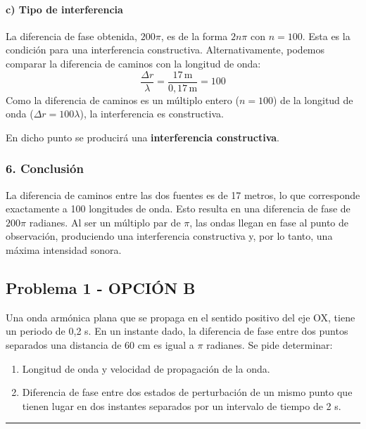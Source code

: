 \paragraph{c) Tipo de interferencia}
La diferencia de fase obtenida, $200\pi$, es de la forma $2n\pi$ con $n=100$. Esta es la condición para una interferencia constructiva.
Alternativamente, podemos comparar la diferencia de caminos con la longitud de onda:
$$ \frac{\Delta r}{\lambda} = \frac{17 \, \text{m}}{0,17 \, \text{m}} = 100 $$
Como la diferencia de caminos es un múltiplo entero ($n=100$) de la longitud de onda ($\Delta r = 100\lambda$), la interferencia es constructiva.

\begin{cajaresultado}
    En dicho punto se producirá una \textbf{interferencia constructiva}.
\end{cajaresultado}

\subsubsection*{6. Conclusión}
\begin{cajaconclusion}
La diferencia de caminos entre las dos fuentes es de 17 metros, lo que corresponde exactamente a 100 longitudes de onda. Esto resulta en una diferencia de fase de $200\pi$ radianes. Al ser un múltiplo par de $\pi$, las ondas llegan en fase al punto de observación, produciendo una interferencia constructiva y, por lo tanto, una máxima intensidad sonora.
\end{cajaconclusion}

\newpage

\subsection{Problema 1 - OPCIÓN B}
\label{subsec:2B_2000_jun_ord}

\begin{cajaenunciado}
Una onda armónica plana que se propaga en el sentido positivo del eje OX, tiene un periodo de 0,2 s. En un instante dado, la diferencia de fase entre dos puntos separados una distancia de 60 cm es igual a $\pi$ radianes. Se pide determinar:
\begin{enumerate}
    \item Longitud de onda y velocidad de propagación de la onda.
    \item Diferencia de fase entre dos estados de perturbación de un mismo punto que tienen lugar en dos instantes separados por un intervalo de tiempo de 2 s.
\end{enumerate}
\end{cajaenunciado}
\hrule

